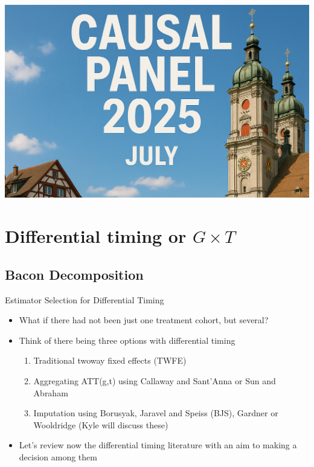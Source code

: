 \documentclass{beamer}
\begin{document}
\begin{frame}[plain]  %
\vfill
\begin{center}
  \includegraphics[width=0.85\linewidth]{./lecture_includes/banner_cropped}
\end{center}
\vfill
\end{frame}






\section{Differential timing or $G \times T$} 

\subsection{Bacon Decomposition}

\begin{frame}{Estimator Selection for Differential Timing}

\begin{itemize}
\item What if there had not been just one treatment cohort, but several? 
\item Think of there being three options with differential timing 
	\begin{enumerate}
	\item Traditional twoway fixed effects (TWFE)
	\item Aggregating ATT(g,t) using Callaway and Sant'Anna or Sun and Abraham
	\item Imputation using Borusyak, Jaravel and Speiss (BJS), Gardner or Wooldridge (Kyle will discuss these)
	\end{enumerate}
\item  Let's review now the differential timing literature with an aim to making a decision among them
\end{itemize}

\end{frame}
\end{document}
